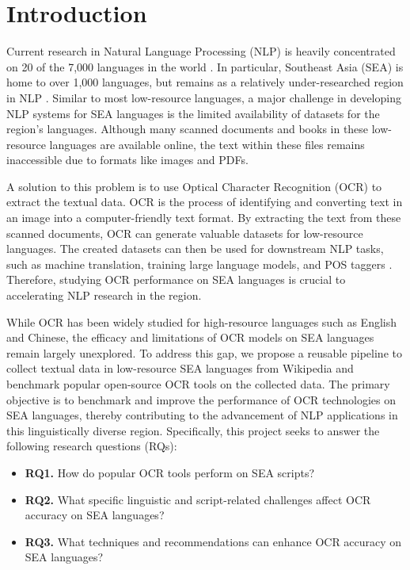 \documentclass[12pt,oneside]{memoir}
\begin{document}
\chapter{Introduction}
Current research in Natural Language Processing (NLP) is heavily concentrated on 20 of the 7,000 languages in the world \parencite{magueresse-etal-2020}.
In particular, Southeast Asia (SEA) is home to over 1,000 languages, but remains as a relatively under-researched region in NLP \parencite{aji-etal-2023}.
Similar to most low-resource languages, a major challenge in developing NLP systems for SEA languages is the limited availability of datasets for the region’s languages.
Although many scanned documents and books in these low-resource languages are available online, the text within these files remains inaccessible due to formats like images and PDFs.

A solution to this problem is to use Optical Character Recognition (OCR) to extract the textual data.
OCR is the process of identifying and converting text in an image into a computer-friendly text format.
By extracting the text from these scanned documents, OCR can generate valuable datasets for low-resource languages.
The created datasets can then be used for downstream NLP tasks, such as machine translation, training large language models, and POS taggers \parencite{ignat-etal-2022} \parencite{agarwal-and-anastasopoulos-2024}.
Therefore, studying OCR performance on SEA languages is crucial to accelerating NLP research in the region.

While OCR has been widely studied for high-resource languages such as English and Chinese, the efficacy and limitations of OCR models on SEA languages remain largely unexplored.
To address this gap, we propose a reusable pipeline to collect textual data in low-resource SEA languages from Wikipedia and benchmark popular open-source OCR tools on the collected data.
The primary objective is to benchmark and improve the performance of OCR technologies on SEA languages, thereby contributing to the advancement of NLP applications in this linguistically diverse region.
Specifically, this project seeks to answer the following research questions (RQs):

\begin{itemize}
    \item \textbf{RQ1.} How do popular OCR tools perform on SEA scripts?
    \item \textbf{RQ2.} What specific linguistic and script-related challenges affect OCR accuracy on SEA languages?
    \item \textbf{RQ3.} What techniques and recommendations can enhance OCR accuracy on SEA languages?
\end{itemize}
\end{document}
